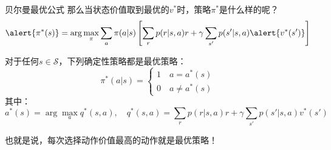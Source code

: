 \begin{frame}{贝尔曼最优公式}
    那么当状态价值取到最优的$v^*$时，策略$\pi^*$是什么样的呢？
    \[
        \alert{\pi^*(s)}=\arg\underset{\pi}{\max}\sum_a\pi(a|s)\left[\sum_r p(r|s,a)r+\gamma\sum_{s'}p(s'|s,a)\alert{v^*(s')}\right]
    \]
    \begin{theorem}[贝尔曼最优定理]
        对于任何$s\in \mathcal{S}$，下列确定性策略都是最优策略：
        \[
            \pi^*(a|s)=
            \begin{cases}
                1 \quad a=a^*(s) \\
                0 \quad a\neq a^*(s)
            \end{cases}
        \]
        其中：
        \[
                a^*(s)=\arg\underset{a}{\max} q^*(s,a),\quad
                q^*(s,a)=\sum_r p(r|s,a)r+\gamma\sum_{s'}p(s'|s,a)v^*(s')
        \]
    \end{theorem}

    也就是说，\alert{每次选择动作价值最高的动作就是最优策略！}
\end{frame}

